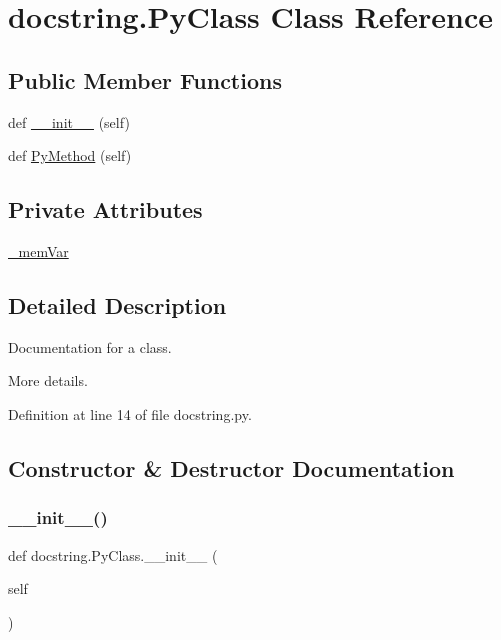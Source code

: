 \hypertarget{classdocstring_1_1_py_class}{}\section{docstring.\+Py\+Class Class Reference}
\label{classdocstring_1_1_py_class}
\subsection*{Public Member Functions}
\begin{DoxyCompactItemize}
\item 
def \mbox{\hyperlink{classdocstring_1_1_py_class_a00dd800dc15e2b727e2a37c6f6c40e8b}{\+\_\+\+\_\+init\+\_\+\+\_\+}} (self)
\item 
def \mbox{\hyperlink{classdocstring_1_1_py_class_af092e1eacc10334e0e8630531a3473b4}{Py\+Method}} (self)
\end{DoxyCompactItemize}
\subsection*{Private Attributes}
\begin{DoxyCompactItemize}
\item 
\mbox{\hyperlink{classdocstring_1_1_py_class_a45ced0d4bfe82f1f5df00bdb7a19aa0f}{\+\_\+mem\+Var}}
\end{DoxyCompactItemize}


\subsection{Detailed Description}
\begin{DoxyVerb}Documentation for a class.

More details.
\end{DoxyVerb}
 

Definition at line 14 of file docstring.\+py.



\subsection{Constructor \& Destructor Documentation}
\mbox{\label{classdocstring_1_1_py_class_a00dd800dc15e2b727e2a37c6f6c40e8b}} 
\subsubsection{\texorpdfstring{\_\_init\_\_()}{\_\_init\_\_()}}
{\footnotesize\ttfamily def docstring.\+Py\+Class.\+\_\+\+\_\+init\+\_\+\+\_\+ (\begin{DoxyParamCaption}\item[{}]{self }\end{DoxyParamCaption})}

